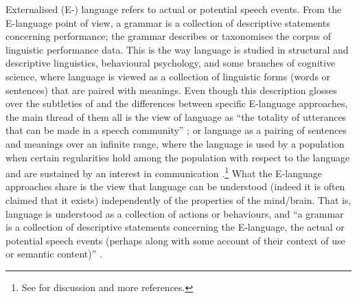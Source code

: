 Externalised (E-) language refers to actual or potential speech events. From the E-language point of view, a grammar is a collection of descriptive statements concerning performance; the grammar describes or taxonomises the corpus of linguistic performance data. This is the way language is studied in structural and descriptive linguistics, behavioural psychology, and some branches of cognitive science, where language is viewed as a collection of linguistic forms (words or sentences) that are paired with meanings. Even though this description glosses over the subtleties of and the differences between specific E-language approaches, the main thread of them all is the view of language as “the totality of utterances that can be made in a speech community” \citep[155]{Bloomfield1926}; or language as a pairing of sentences and meanings over an infinite range, where the language is used by a population when certain regularities hold among the population with respect to the language and are sustained by an interest in communication \citep{Lewis1975}.\footnote{See \citet[19]{Chomsky1986} for discussion and more references.} What the E-language approaches share is the view that language can be understood (indeed it is often claimed that it exists) independently of the properties of the mind/brain. That is, language is understood as a collection of actions or behaviours, and “a grammar is a collection of descriptive statements concerning the E-language, the actual or potential speech events (perhaps along with some account of their context of use or semantic content)” \citep[20]{Chomsky1986}. 

